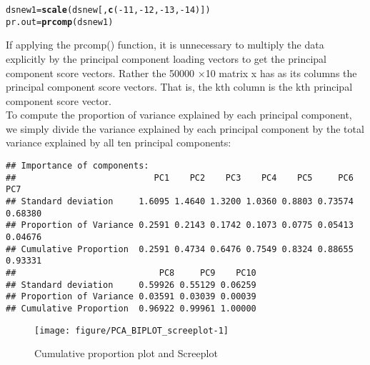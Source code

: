 \documentclass{article}\usepackage[]{graphicx}\usepackage[]{color}
\makeatletter
\newcommand{\hlnum}[1]{\textcolor[rgb]{0.686,0.059,0.569}{#1}}%
\newcommand{\hlopt}[1]{\textcolor[rgb]{0,0,0}{#1}}%
\newcommand{\hlstd}[1]{\textcolor[rgb]{0.345,0.345,0.345}{#1}}%
\newcommand{\hlkwb}[1]{\textcolor[rgb]{0.69,0.353,0.396}{#1}}%
\newcommand{\hlkwd}[1]{\textcolor[rgb]{0.737,0.353,0.396}{\textbf{#1}}}%
\newenvironment{kframe}{%
 \def\at@end@of@kframe{}%
 \ifinner\ifhmode%
  \def\at@end@of@kframe{\end{minipage}}%
  \begin{minipage}{\columnwidth}%
 \fi\fi%
 \def\FrameCommand##1{\hskip\@totalleftmargin \hskip-\fboxsep
 \colorbox{shadecolor}{##1}\hskip-\fboxsep
     \hskip-\linewidth \hskip-\@totalleftmargin \hskip\columnwidth}%
 \MakeFramed {\advance\hsize-\width
   \@totalleftmargin\z@ \linewidth\hsize
   \@setminipage}}%
 {\par\unskip\endMakeFramed%
 \at@end@of@kframe}
\newenvironment{knitrout}{}{} %
\makeatother
\begin{document}
\begin{knitrout}
\color{fgcolor}\begin{kframe}
\begin{alltt}
\hlstd{dsnew1} \hlkwb{=} \hlkwd{scale}\hlstd{(dsnew[,} \hlkwd{c}\hlstd{(}\hlopt{-}\hlnum{11}\hlstd{,} \hlopt{-}\hlnum{12}\hlstd{,} \hlopt{-}\hlnum{13}\hlstd{,} \hlopt{-}\hlnum{14}\hlstd{)])}
\hlstd{pr.out} \hlkwb{=} \hlkwd{prcomp}\hlstd{(dsnew1)}
\end{alltt}
\end{kframe}
\end{knitrout}
\noindent	If applying the prcomp() function, it is unnecessary to  multiply the data explicitly by the principal component loading vectors to get the principal component score vectors. 
 Rather the 50000 ×10 matrix x has as its columns the principal component score vectors. That is, the kth column is
the kth principal component score vector.\\

\noindent	To compute the proportion of variance explained by each principal component, we simply divide the variance explained by each principal component
by the total variance explained by all ten principal components:\\
\begin{knitrout}
\color{fgcolor}\begin{kframe}
\begin{verbatim}
## Importance of components:
##                           PC1    PC2    PC3    PC4    PC5     PC6     PC7
## Standard deviation     1.6095 1.4640 1.3200 1.0360 0.8803 0.73574 0.68380
## Proportion of Variance 0.2591 0.2143 0.1742 0.1073 0.0775 0.05413 0.04676
## Cumulative Proportion  0.2591 0.4734 0.6476 0.7549 0.8324 0.88655 0.93331
##                            PC8     PC9    PC10
## Standard deviation     0.59926 0.55129 0.06259
## Proportion of Variance 0.03591 0.03039 0.00039
## Cumulative Proportion  0.96922 0.99961 1.00000
\end{verbatim}
\end{kframe}
\end{knitrout}
{\begin{figure}[h!]
		\caption{Cumulative proportion plot and Screeplot}
		\centering \texttt{[image: figure/PCA\_BIPLOT\_screeplot-1]} 	
		\label{fig:arrrr} 
	\end{figure}
}
\end{document}
